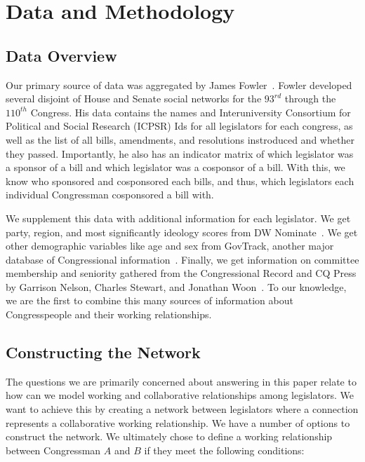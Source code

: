 \section{Data and Methodology}

\subsection{Data Overview}

Our primary source of data was aggregated by James Fowler~\cite{Fowler}. Fowler
developed several disjoint of House and Senate social networks for the $93^{rd}$
through the $110^{th}$ Congress. His data contains the names and Interuniversity
Consortium for Political and Social Research (ICPSR) Ids for all legislators for
each congress, as well as the list of all bills, amendments, and resolutions
instroduced and whether they passed. Importantly, he also has an indicator
matrix of which legislator was a sponsor of a bill and which legislator was a
cosponsor of a bill. With this, we know who sponsored and cosponsored each
bills, and thus,  which legislators each individual Congressman cosponsored a
bill with.

We supplement this data with additional information for each legislator. We get
party, region, and most significantly ideology scores from DW Nominate~\cite{DW-
NOMINATE}. We get other demographic variables like age and sex from GovTrack,
another major database of Congressional information~\cite{GovTrack}. Finally, we
get information on committee membership and seniority gathered from the
Congressional Record and CQ Press by Garrison Nelson, Charles Stewart, and
Jonathan Woon~\cite{Nelson, Stewart}. To our knowledge, we are the first to
combine this many sources of information about Congresspeople and their working
relationships.

\subsection{Constructing the Network}

The questions we are primarily concerned about answering in this paper relate 
to how can we model working and collaborative relationships among legislators. 
We want to achieve this by creating a network between legislators where a 
connection represents a collaborative working relationship. We have a number of 
options to construct the network. We ultimately chose to define a working 
relationship between Congressman $A$ and $B$ if they meet the following 
conditions:

